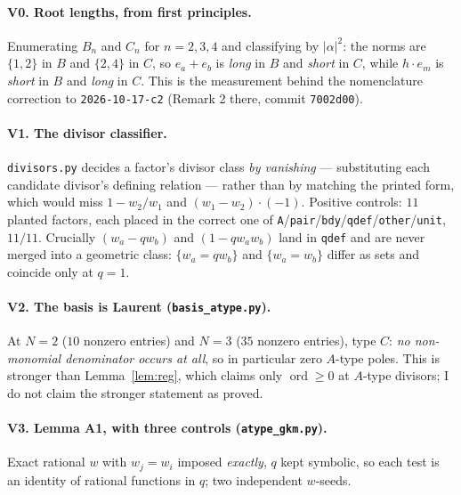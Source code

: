 \documentclass[11pt]{article}
\theoremstyle{plain}
\theoremstyle{definition}
\theoremstyle{remark}
\theoremstyle{plain}
\newcommand{\ord}{\operatorname{ord}}
\begin{document}
\paragraph{V0. Root lengths, from first principles.}
Enumerating $B_n$ and $C_n$ for $n=2,3,4$ and classifying by $|\alpha|^2$: the
norms are $\{1,2\}$ in $B$ and $\{2,4\}$ in $C$, so $e_a+e_b$ is \emph{long} in
$B$ and \emph{short} in $C$, while $h\cdot e_m$ is \emph{short} in $B$ and
\emph{long} in $C$.  This is the measurement behind the nomenclature correction
to \texttt{2026-10-17-c2} (Remark 2 there, commit \texttt{7002d00}).

\paragraph{V1. The divisor classifier.}
\texttt{divisors.py} decides a factor's divisor class \emph{by vanishing} ---
substituting each candidate divisor's defining relation --- rather than by
matching the printed form, which would miss $1-w_2/w_1$ and $(w_1-w_2)\cdot(-1)$.
Positive controls: $11$ planted factors, each placed in the correct one of
\texttt{A}/\texttt{pair}/\texttt{bdy}/\texttt{qdef}/\texttt{other}/\texttt{unit},
$11/11$.  Crucially $(w_a-qw_b)$ and $(1-qw_aw_b)$ land in \texttt{qdef} and are
never merged into a geometric class: $\{w_a=qw_b\}$ and $\{w_a=w_b\}$ differ as
sets and coincide only at $q=1$.

\paragraph{V2. The basis is Laurent (\texttt{basis\_atype.py}).}
At $N=2$ ($10$ nonzero entries) and $N=3$ ($35$ nonzero entries), type $C$:
\emph{no non-monomial denominator occurs at all}, so in particular zero $A$-type
poles.  This is stronger than Lemma~\ref{lem:reg}, which claims only
$\ord\ge0$ at $A$-type divisors; I do not claim the stronger statement as proved.

\paragraph{V3. Lemma A1, with three controls (\texttt{atype\_gkm.py}).}
Exact rational $w$ with $w_j=w_i$ imposed \emph{exactly}, $q$ kept symbolic, so
each test is an identity of rational functions in $q$; two independent $w$-seeds.
\end{document}
